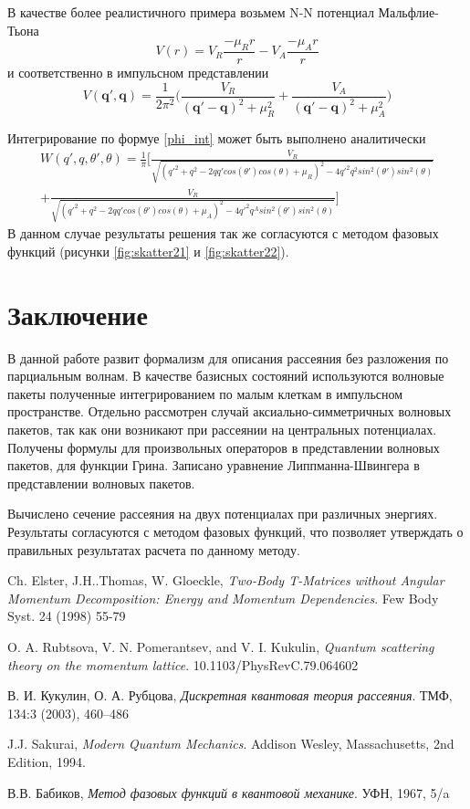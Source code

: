 \documentclass[a4paper,12pt]{article}
\newcommand{\vect}[1]{\boldsymbol{#1}}
\begin{document}
В качестве более реалистичного примера возьмем N-N потенциал Мальфлие-Тьона
\[
V(r) = V_R\frac{-\mu_Rr}{r} - V_A\frac{-\mu_Ar}{r}
\]
и соответственно в импульсном представлении
\[
V(\vect{q'},\vect{q}) = \frac{1}{2\pi^2}\bigg( \frac{V_R}{(\vect{q'}-\vect{q})^2+\mu_R^2} + \frac{V_A}{(\vect{q'}-\vect{q})^2+\mu_A^2} \bigg)
\]

Интегрирование по формуе \ref{phi_int} может быть выполнено аналитически
\begin{multline}
W(q',q,\theta',\theta) = \frac{1}{\pi}\bigg[ \frac{V_R}{\sqrt{(q'^2+q^2-2qq'cos(\theta')cos(\theta)+\mu_R)^2 - 4q'^2q^2sin^2(\theta')sin^2(\theta) }} \\ +  \frac{V_R}{\sqrt{(q'^2+q^2-2qq'cos(\theta')cos(\theta)+\mu_A)^2 - 4q'^2q^Asin^2(\theta')sin^2(\theta) }} \bigg]
\end{multline}
В данном случае результаты решения так же согласуются с методом фазовых функций (рисунки \ref{fig:skatter21} и \ref{fig:skatter22}).

\newline
\section{Заключение}

В данной работе развит формализм для описания рассеяния без разложения по парциальным волнам. В качестве базисных состояний используются волновые пакеты полученные интегрированием по малым клеткам в импульсном пространстве. Отдельно рассмотрен случай аксиально-симметричных волновых пакетов, так как они возникают при рассеянии на центральных потенциалах. Получены формулы для произвольных операторов в представлении волновых пакетов, для функции Грина. Записано уравнение Липпманна-Швингера в представлении волновых пакетов.

Вычислено сечение рассеяния на двух потенциалах при различных энергиях. Результаты согласуются с методом фазовых функций, что позволяет утверждать о правильных результатах расчета по данному методу.


\pagebreak
{} 
\begin{thebibliography}{9}

  Ch. Elster, J.H..Thomas, W. Gloeckle,
  \emph{Two-Body T-Matrices without Angular Momentum Decomposition: Energy and Momentum Dependencies}.
  Few Body Syst. 24 (1998) 55-79

  O. A. Rubtsova, V. N. Pomerantsev, and V. I. Kukulin,
  \emph{Quantum scattering theory on the momentum lattice}.
  10.1103/PhysRevC.79.064602

  В. И. Кукулин, О. А. Рубцова,
  \emph{Дискретная квантовая теория рассеяния}.
  ТМФ, 134:3 (2003), 460–486 

  J.J. Sakurai,
  \emph{Modern Quantum Mechanics}.
  Addison Wesley, Massachusetts,
  2nd Edition,
  1994.

  В.В. Бабиков,
  \emph{Метод фазовых функций в квантовой механике}.
  УФН, 1967, 5/a

\end{thebibliography}


    
\end{document}
